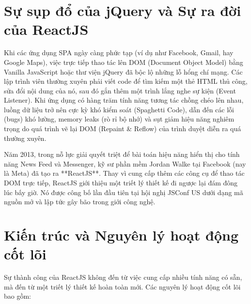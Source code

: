 \section{Sự sụp đổ của jQuery và Sự ra đời của ReactJS}
Khi các ứng dụng SPA ngày càng phức tạp (ví dụ như Facebook, Gmail, hay Google Maps), việc trực tiếp thao tác lên DOM (Document Object Model) bằng Vanilla JavaScript hoặc thư viện jQuery đã bộc lộ những lỗ hổng chí mạng. Các lập trình viên thường xuyên phải viết code để tìm kiếm một thẻ HTML thủ công, sửa đổi nội dung của nó, sau đó gắn thêm một trình lắng nghe sự kiện (Event Listener). Khi ứng dụng có hàng trăm tính năng tương tác chồng chéo lên nhau, luồng dữ liệu trở nên cực kỳ khó kiểm soát (Spaghetti Code), dẫn đến các lỗi (bugs) khó lường, memory leaks (rò rỉ bộ nhớ) và sụt giảm hiệu năng nghiêm trọng do quá trình vẽ lại DOM (Repaint \& Reflow) của trình duyệt diễn ra quá thường xuyên.

Năm 2013, trong nỗ lực giải quyết triệt để bài toán hiệu năng hiển thị cho tính năng News Feed và Messenger, kỹ sư phần mềm Jordan Walke tại Facebook (nay là Meta) đã tạo ra **ReactJS**. Thay vì cung cấp thêm các công cụ để thao tác DOM trực tiếp, ReactJS giới thiệu một triết lý thiết kế đi ngược lại đám đông lúc bấy giờ. Nó được công bố lần đầu tiên tại hội nghị JSConf US dưới dạng mã nguồn mở và lập tức gây bão trong giới công nghệ.

\section{Kiến trúc và Nguyên lý hoạt động cốt lõi}
Sự thành công của ReactJS không đến từ việc cung cấp nhiều tính năng có sẵn, mà đến từ một triết lý thiết kế hoàn toàn mới. Các nguyên lý hoạt động cốt lõi bao gồm:

